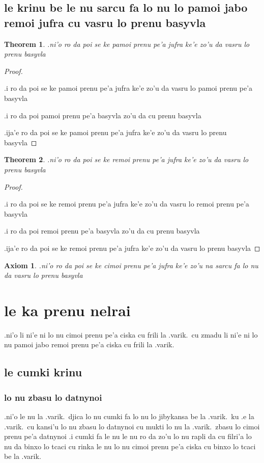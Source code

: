 \documentclass{article}
\newtheorem{thm}{Theorem}
\newtheorem{axiom}{Axiom}
\begin{document}
\subsection{le krinu be le nu sarcu fa lo nu lo pamoi jabo remoi jufra cu vasru lo prenu basyvla}
\begin{thm}
	.ni'o ro da poi se ke pamoi prenu pe'a jufra ke'e zo'u da vasru lo prenu basyvla
\end{thm}
\begin{proof}
	${}$

	.i ro da poi se ke pamoi prenu pe'a jufra ke'e zo'u da vasru lo pamoi prenu pe'a basyvla

	.i ro da poi pamoi prenu pe'a basyvla zo'u da cu prenu basyvla

	.ija'e ro da poi se ke pamoi prenu pe'a jufra ke'e zo'u da vasru lo prenu basyvla
\end{proof}
\begin{thm}
	.ni'o ro da poi se ke remoi prenu pe'a jufra ke'e zo'u da vasru lo prenu basyvla
\end{thm}
\begin{proof}
	${ }$

	.i ro da poi se ke remoi prenu pe'a jufra ke'e zo'u da vasru lo remoi prenu pe'a basyvla

	.i ro da poi remoi prenu pe'a basyvla zo'u da cu prenu basyvla

	.ija'e ro da poi se ke remoi prenu pe'a jufra ke'e zo'u da vasru lo prenu basyvla
\end{proof}
\begin{axiom}
	.ni'o ro da poi se ke cimoi prenu pe'a jufra ke'e zo'u na sarcu fa lo nu da vasru lo prenu basyvla
\end{axiom}
\section{le ka prenu nelrai}
.ni'o li ni'e ni lo nu cimoi prenu pe'a ciska cu frili la .varik.\ cu zmadu li ni'e ni lo nu pamoi jabo remoi prenu pe'a ciska cu frili la .varik.
\subsection{le cumki krinu}
\subsubsection{lo nu zbasu lo datnynoi}
.ni'o le nu la .varik.\ djica lo nu cumki fa lo nu lo jibykansa be la .varik.\ ku .e la .varik.\ cu kansi'u lo nu zbasu lo datnynoi cu mukti lo nu la .varik.\ zbasu lo cimoi prenu pe'a datnynoi  .i cumki fa le nu le nu ro da zo'u lo nu rapli da cu filri'a lo nu da binxo lo tcaci cu rinka le nu lo nu cimoi prenu pe'a ciska cu binxo lo tcaci be la .varik.
\end{document}
